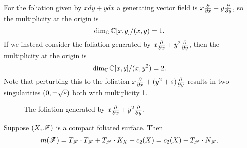 \begin{example}
    For the foliation given by $xdy+ydx$ a generating vector field is
    $x\pdv{}{x}-y\pdv{}{y}$, so the multiplicity at the origin is
    \begin{equation*}
        \dim_{\mathbb{C}}\mathbb{C}[x,y]/(x,y) = 1.
    \end{equation*}
    If we instead consider the foliation generated by $x\pdv{}{x}+y^2\pdv{}{y}$,
    then the multiplicity at the origin is
    \begin{equation*}
        \dim_{\mathbb{C}}\mathbb{C}[x,y]/(x,y^2) = 2.
    \end{equation*}
    Note that perturbing this to the foliation $x\pdv{}{x}+(y^2+\varepsilon)\pdv{}{y}$
    results in two singularities $(0,\pm\sqrt{\varepsilon})$ both with multiplicity 1.
    \begin{figure}[H]
        \centering
        \caption{The foliation generated by $x\pdv{}{x}+y^2\pdv{}{y}$.}
    \end{figure}
\end{example}

\begin{proposition}\label{prop:multiplicity}
    Suppose $(X,\mathscr{F})$ is a compact foliated surface. Then
    \begin{align*}
        m(\mathscr{F})
            = T_{\mathscr{F}}\cdot T_{\mathscr{F}} + T_{\mathscr{F}}\cdot K_X + c_2(X)
            = c_2(X) - T_{\mathscr{F}}\cdot N_{\mathscr{F}}.
    \end{align*}
\end{proposition}

